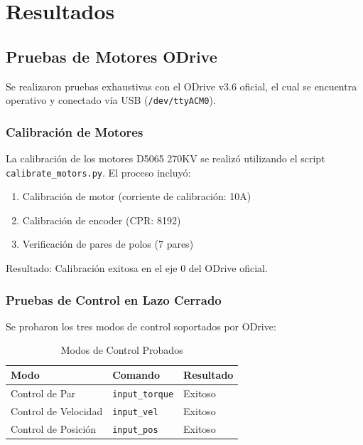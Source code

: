 \chapter{Resultados}

\section{Pruebas de Motores ODrive}

Se realizaron pruebas exhaustivas con el ODrive v3.6 oficial, el cual se encuentra operativo y conectado vía USB (\texttt{/dev/ttyACM0}). 

\subsection{Calibración de Motores}

La calibración de los motores D5065 270KV se realizó utilizando el script \texttt{calibrate\_motors.py}. El proceso incluyó:

\begin{enumerate}
    \item Calibración de motor (corriente de calibración: 10A)
    \item Calibración de encoder (CPR: 8192)
    \item Verificación de pares de polos (7 pares)
\end{enumerate}

Resultado: Calibración exitosa en el eje 0 del ODrive oficial.

\subsection{Pruebas de Control en Lazo Cerrado}

Se probaron los tres modos de control soportados por ODrive:

\begin{table}[h]
\centering
\caption{Modos de Control Probados}
\label{tab:control_modes}
\begin{tabular}{lll}
\toprule
\textbf{Modo} & \textbf{Comando} & \textbf{Resultado} \\
\midrule
Control de Par & \texttt{input\_torque} & Exitoso \\
Control de Velocidad & \texttt{input\_vel} & Exitoso \\
Control de Posición & \texttt{input\_pos} & Exitoso \\
\bottomrule
\end{tabular}
\end{table}

